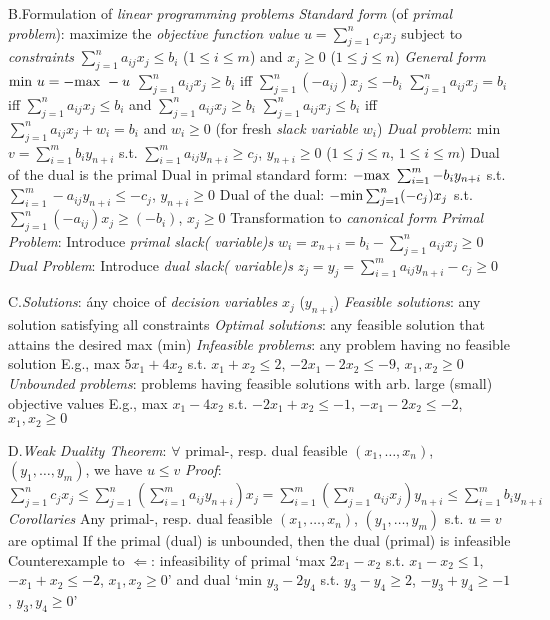 \item{B.}Formulation of \emph{linear programming problems}\smallskip
{}\emph{Standard form} (of \emph{primal problem}): maximize
the \emph{objective function value} $u=\sum_{j=1}^nc_{j}x_j$ subject to
\emph{constraints} $\sum_{j=1}^na_{ij}x_j\leq b_i$
($1\leq i\leq m$) and $x_j\geq 0$ ($1\leq j\leq n$)\smallskip
{}\emph{General form}\smallskip
{}${\rm min}\ u=-{\rm max}\ -u$\smallskip
{}$\sum_{j=1}^na_{ij}x_j\geq b_i$ iff $\sum_{j=1}^n(-a_{ij})x_j\leq
-b_i$\smallskip
{}$\sum_{j=1}^na_{ij}x_j=b_i$ iff $\sum_{j=1}^na_{ij}x_j\leq b_i$ and
$\sum_{j=1}^na_{ij}x_j\geq b_i$\smallskip
{}$\sum_{j=1}^na_{ij}x_j\leq b_i$ iff $\sum_{j=1}^na_{ij}x_j+w_i=b_i$
and $w_i\geq 0$ (for fresh \emph{slack variable} $w_i$)\smallskip
{}\emph{Dual problem}: min $v=\sum_{i=1}^mb_iy_{n+i}$
s.t. $\sum_{i=1}^ma_{ij}y_{n+i}\geq c_j$, $y_{n+i}\geq 0$ ($1\leq j\leq n$, $1\leq i
\leq m$)\smallskip
{}Dual of the dual is the primal\smallskip
{}Dual in primal standard form: $-{\rm max}\ \sum_{i=1}^m-b_iy_{n+i}$
s.t. $\sum_{i=1}^m-a_{ij}y_{n+i}\leq-c_j$, $y_{n+i}\geq 0$\smallskip
{}Dual of the dual: $-{\rm min}\sum_{j=1}^n(-c_j)x_j$ s.t.
$\sum_{j=1}^n(-a_{ij})x_j\geq(-b_i)$, $x_j\geq 0$\smallskip
{}Transformation to \emph{canonical form}\smallskip
{}\emph{Primal Problem}: Introduce \emph{primal slack( variable)s}
$w_i=x_{n+i}=b_i-\sum_{j=1}^na_{ij}x_j\geq 0$\smallskip
{}\emph{Dual Problem}: Introduce \emph{dual slack( variable)s}
$z_j=y_j=\sum_{i=1}^ma_{ij}y_{n+i}-c_j\geq 0$\smallskip

\item{C.}\emph{Solutions}: \'any choice of \emph{decision variables} $x_j$
($y_{n+i}$)\smallskip
{}\emph{Feasible solutions}: any solution satisfying all constraints
\smallskip
{}\emph{Optimal solutions}: any feasible solution that attains the
desired max (min)\smallskip
{}\emph{Infeasible problems}: any problem having no feasible solution
\smallskip
{}E.g., max $5x_1+4x_2$ s.t. $x_1+x_2\leq 2$, $-2x_1-2x_2\leq-9$,
$x_1,x_2\geq 0$\smallskip
{}\emph{Unbounded problems}: problems having feasible solutions with
arb. large (small) objective values\smallskip
{}E.g., max $x_1-4x_2$ s.t. $-2x_1+x_2\leq -1$, $-x_1-2x_2\leq-2$,
$x_1,x_2\geq 0$\smallskip

\item{D.}\emph{Weak Duality Theorem}: $\forall$ primal-, resp. dual feasible
$(x_1,\ldots,x_n)$, $(y_1,\ldots,y_m)$, we have $u\leq v$\smallskip
{}\emph{Proof}: $\sum_{j=1}^nc_jx_j\leq\sum_{j=1}^n\left(\sum_{i=1}^m
a_{ij}y_{n+i}\right)x_j=\sum_{i=1}^m\left(\sum_{j=1}^na_{ij}x_j\right)y_{n+i}\leq
\sum_{i=1}^mb_iy_{n+i}$\smallskip
{}\emph{Corollaries}\smallskip
{}Any primal-, resp. dual feasible $(x_1,\ldots,x_n)$, $(y_1,\ldots,
y_m)$ s.t. $u=v$ are optimal\smallskip
{}If the primal (dual) is unbounded, then the dual (primal) is
infeasible\smallskip
{}Counterexample to $\Leftarrow$: infeasibility of primal
`max $2x_1-x_2$ s.t. $x_1-x_2\leq 1$, $-x_1+x_2\leq -2$, $x_1,x_2\geq 0$' and
dual `min $y_3-2y_4$ s.t. $y_3-y_4\geq 2$, $-y_3+y_4\geq -1$, $y_3,y_4\geq
0$'\smallskip

\vfill\eject
